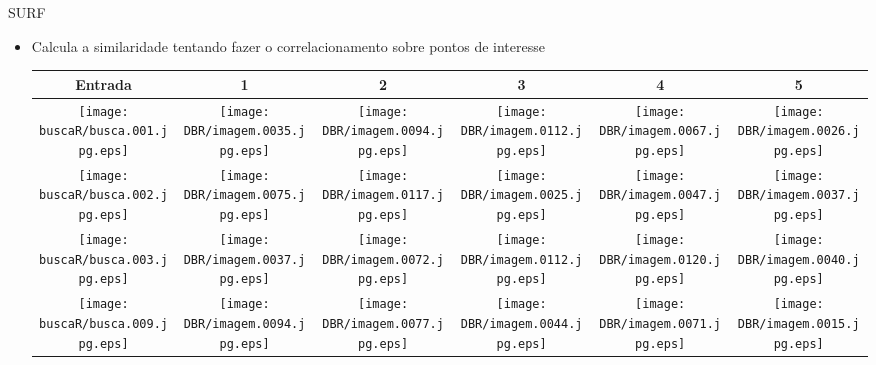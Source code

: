 \documentclass[
    style=paintings,
    paper=screen,
    blackslide,
    nopagebreaks,
    fleqn
]{powerdot}
\begin{document}
\begin{slide}{SURF}
\begin{itemize}[type=1]
\item <1-> Calcula a similaridade tentando fazer o correlacionamento sobre pontos de interesse
\vspace{-0.8cm}
\begin{table}[H]
\begin{center}
\begin{tabular}{c|ccccc}
\hline 
Entrada & 1 & 2 & 3 & 4 & 5\tabularnewline
\hline
\texttt{[image: buscaR/busca.001.jpg.eps]} & 
\texttt{[image: DBR/imagem.0035.jpg.eps]} & 
\texttt{[image: DBR/imagem.0094.jpg.eps]} & 
\texttt{[image: DBR/imagem.0112.jpg.eps]} & 
\texttt{[image: DBR/imagem.0067.jpg.eps]} &
\texttt{[image: DBR/imagem.0026.jpg.eps]} 
\tabularnewline
\hline 
\texttt{[image: buscaR/busca.002.jpg.eps]} & 
\texttt{[image: DBR/imagem.0075.jpg.eps]} & 
\texttt{[image: DBR/imagem.0117.jpg.eps]} & 
\texttt{[image: DBR/imagem.0025.jpg.eps]} & 
\texttt{[image: DBR/imagem.0047.jpg.eps]} &
\texttt{[image: DBR/imagem.0037.jpg.eps]} 
\tabularnewline
\hline 
\texttt{[image: buscaR/busca.003.jpg.eps]} & 
\texttt{[image: DBR/imagem.0037.jpg.eps]} & 
\texttt{[image: DBR/imagem.0072.jpg.eps]} & 
\texttt{[image: DBR/imagem.0112.jpg.eps]} & 
\texttt{[image: DBR/imagem.0120.jpg.eps]} &
\texttt{[image: DBR/imagem.0040.jpg.eps]} 
\tabularnewline
\hline 
\texttt{[image: buscaR/busca.009.jpg.eps]} & 
\texttt{[image: DBR/imagem.0094.jpg.eps]} & 
\texttt{[image: DBR/imagem.0077.jpg.eps]} & 
\texttt{[image: DBR/imagem.0044.jpg.eps]} & 
\texttt{[image: DBR/imagem.0071.jpg.eps]} &
\texttt{[image: DBR/imagem.0015.jpg.eps]} 
\tabularnewline
\hline 
\end{tabular}
\end{center}
\end{table}
\end{itemize}
\end{slide}
\end{document}
